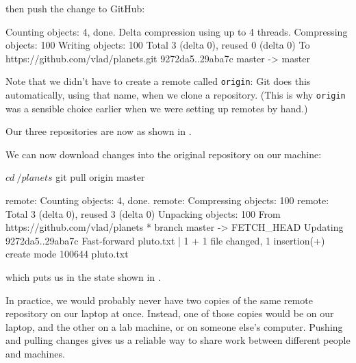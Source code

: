 then push the change to GitHub:


\begin{VerbOut}
Counting objects: 4, done.
Delta compression using up to 4 threads.
Compressing objects: 100%
Writing objects: 100%
Total 3 (delta 0), reused 0 (delta 0)
To https://github.com/vlad/planets.git
   9272da5..29aba7c  master -> master
\end{VerbOut}

Note that we didn't have to create a remote called \texttt{origin}: Git
does this automatically, using that name, when we clone a repository.
(This is why \texttt{origin} was a sensible choice earlier when we were
setting up remotes by hand.)

Our three repositories are now as shown in .


We can now download changes into the original repository on our machine:

\begin{VerbIn}
$ cd ~/planets
$ git pull origin master
\end{VerbIn}

\begin{VerbOut}
remote: Counting objects: 4, done.
remote: Compressing objects: 100%
remote: Total 3 (delta 0), reused 3 (delta 0)
Unpacking objects: 100%
From https://github.com/vlad/planets
 * branch            master     -> FETCH_HEAD
Updating 9272da5..29aba7c
Fast-forward
 pluto.txt | 1 +
 1 file changed, 1 insertion(+)
 create mode 100644 pluto.txt
\end{VerbOut}

which puts us in the state shown in .


In practice, we would probably never have two copies of the same remote
repository on our laptop at once. Instead, one of those copies would be
on our laptop, and the other on a lab machine, or on someone else's
computer. Pushing and pulling changes gives us a reliable way to share
work between different people and machines.

